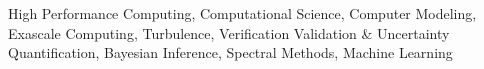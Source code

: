 

High Performance Computing, Computational Science, Computer Modeling, Exascale Computing, Turbulence,
Verification Validation \& Uncertainty Quantification, Bayesian
Inference, Spectral Methods, Machine Learning

